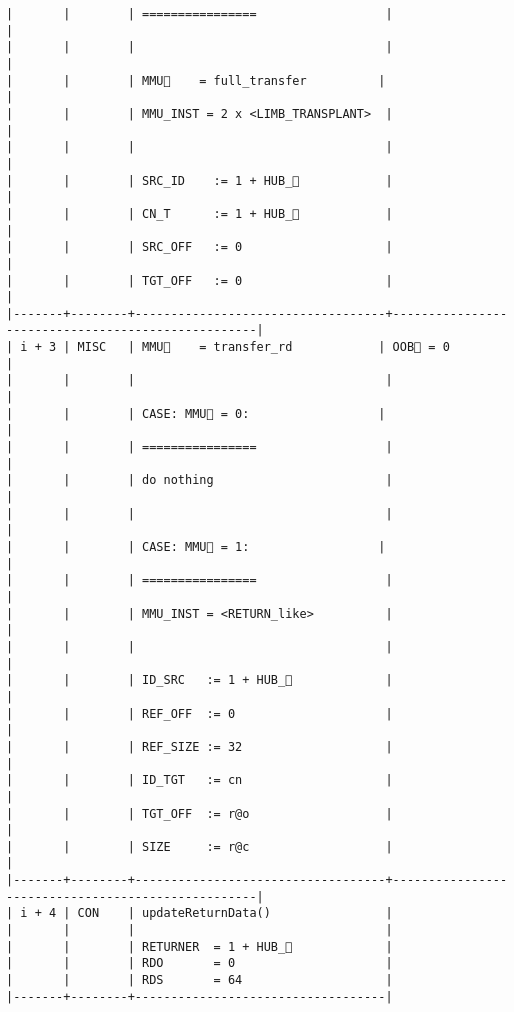 \documentclass[varwidth=\maxdimen,margin=0.5cm,multi={verbatim}]{standalone}
\begin{document}
\begin{verbatim}
|       |        | ================                  |                                                   |
|       |        |                                   |                                                   |
|       |        | MMU🚩    = full_transfer          |                                                   |
|       |        | MMU_INST = 2 x <LIMB_TRANSPLANT>  |                                                   |
|       |        |                                   |                                                   |
|       |        | SRC_ID    := 1 + HUB_            |                                                   |
|       |        | CN_T      := 1 + HUB_            |                                                   |
|       |        | SRC_OFF   := 0                    |                                                   |
|       |        | TGT_OFF   := 0                    |                                                   |
|-------+--------+-----------------------------------+---------------------------------------------------|
| i + 3 | MISC   | MMU🚩    = transfer_rd            | OOB🚩 = 0                                         |
|       |        |                                   |                                                   |
|       |        | CASE: MMU🚩 = 0:                  |                                                   |
|       |        | ================                  |                                                   |
|       |        | do nothing                        |                                                   |
|       |        |                                   |                                                   |
|       |        | CASE: MMU🚩 = 1:                  |                                                   |
|       |        | ================                  |                                                   |
|       |        | MMU_INST = <RETURN_like>          |                                                   |
|       |        |                                   |                                                   |
|       |        | ID_SRC   := 1 + HUB_             |                                                   |
|       |        | REF_OFF  := 0                     |                                                   |
|       |        | REF_SIZE := 32                    |                                                   |
|       |        | ID_TGT   := cn                    |                                                   |
|       |        | TGT_OFF  := r@o                   |                                                   |
|       |        | SIZE     := r@c                   |                                                   |
|-------+--------+-----------------------------------+---------------------------------------------------|
| i + 4 | CON    | updateReturnData()                |
|       |        |                                   |
|       |        | RETURNER  = 1 + HUB_             |
|       |        | RDO       = 0                     |
|       |        | RDS       = 64                    |
|-------+--------+-----------------------------------|

\end{verbatim}
\end{document}
